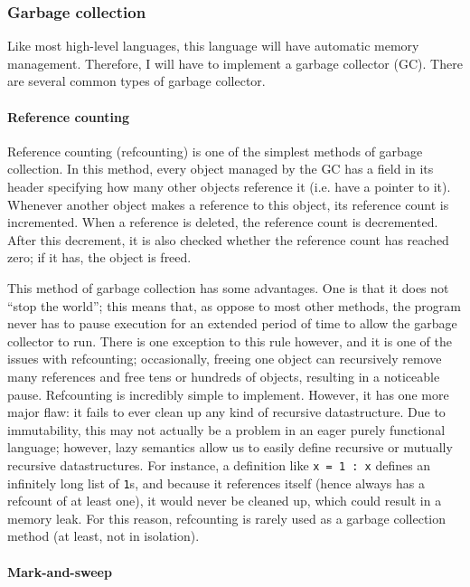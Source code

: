 \documentclass[9pt]{extarticle}
\begin{document}
\subsubsection{Garbage collection}

Like most high-level languages, this language will have automatic memory
management. Therefore, I will have to implement a garbage collector
(GC). There are several common types of garbage collector.

\paragraph{Reference counting}

Reference counting (refcounting) is one of the simplest methods of
garbage collection. In this method, every object managed by the GC has a
field in its header specifying how many other objects reference it (i.e.
have a pointer to it). Whenever another object makes a reference to this
object, its reference count is incremented. When a reference is deleted,
the reference count is decremented. After this decrement, it is also
checked whether the reference count has reached zero; if it has, the
object is freed.

This method of garbage collection has some advantages. One is that it
does not ``stop the world''; this means that, as oppose to most other
methods, the program never has to pause execution for an extended period
of time to allow the garbage collector to run. There is one exception to
this rule however, and it is one of the issues with refcounting;
occasionally, freeing one object can recursively remove many references
and free tens or hundreds of objects, resulting in a noticeable pause.
Refcounting is incredibly simple to implement. However, it has one more
major flaw: it fails to ever clean up any kind of recursive
datastructure. Due to immutability, this may not actually be a problem
in an eager purely functional language; however, lazy semantics allow us
to easily define recursive or mutually recursive datastructures. For
instance, a definition like \verb'x = 1 : x' defines an infinitely long
list of \verb'1's, and because it references itself (hence always has a
refcount of at least one), it would never be cleaned up, which could
result in a memory leak. For this reason, refcounting is rarely used as
a garbage collection method (at least, not in isolation).

\paragraph{Mark-and-sweep}
\end{document}
